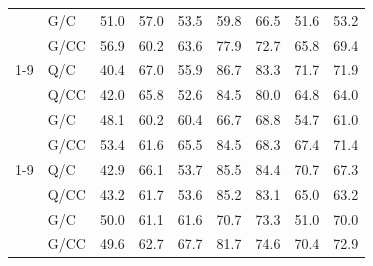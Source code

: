 \begin{table}[t]
\begin{minipage}[t]{0.49\textwidth}
\begin{tabular*}{\linewidth}{@{\extracolsep{\fill}}ll*{7}{r}@{}}
 & G/C & 51.0 & 57.0 & 53.5 & 59.8 & 66.5 & 51.6 & 53.2 \\
 & G/CC & 56.9 & 60.2 & 63.6 & 77.9 & 72.7 & 65.8 & 69.4 \\
\cmidrule(lr){1-9}
\multirow{4}{*}{N} & Q/C & 40.4 & 67.0 & 55.9 & 86.7 & 83.3 & 71.7 & 71.9 \\
 & Q/CC & 42.0 & 65.8 & 52.6 & 84.5 & 80.0 & 64.8 & 64.0 \\
 & G/C & 48.1 & 60.2 & 60.4 & 66.7 & 68.8 & 54.7 & 61.0 \\
 & G/CC & 53.4 & 61.6 & 65.5 & 84.5 & 68.3 & 67.4 & 71.4 \\
\cmidrule(lr){1-9}
\multirow{4}{*}{S} & Q/C & 42.9 & 66.1 & 53.7 & 85.5 & 84.4 & 70.7 & 67.3 \\
 & Q/CC & 43.2 & 61.7 & 53.6 & 85.2 & 83.1 & 65.0 & 63.2 \\
 & G/C & 50.0 & 61.1 & 61.6 & 70.7 & 73.3 & 51.0 & 70.0 \\
 & G/CC & 49.6 & 62.7 & 67.7 & 81.7 & 74.6 & 70.4 & 72.9 \\
\bottomrule
\end{tabular*}
\end{minipage}

\par\vspace{8pt}


\end{table}
